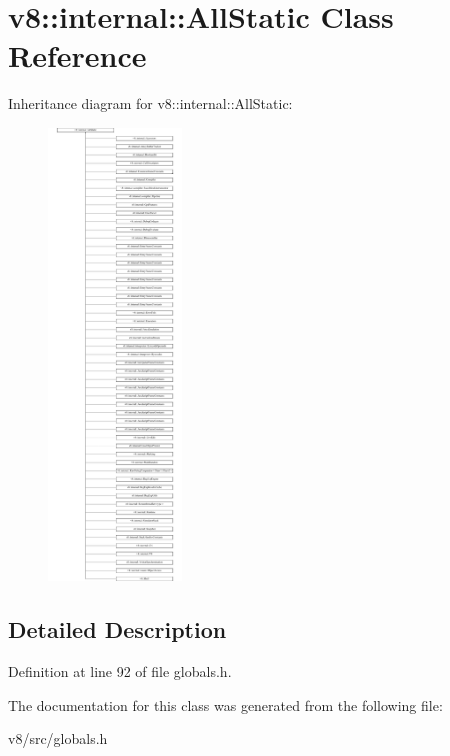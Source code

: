 \hypertarget{classv8_1_1internal_1_1AllStatic}{}\section{v8\+:\+:internal\+:\+:All\+Static Class Reference}
\label{classv8_1_1internal_1_1AllStatic}
Inheritance diagram for v8\+:\+:internal\+:\+:All\+Static\+:\begin{figure}[H]
\begin{center}
\leavevmode
\includegraphics[height=12.000000cm]{classv8_1_1internal_1_1AllStatic}
\end{center}
\end{figure}


\subsection{Detailed Description}


Definition at line 92 of file globals.\+h.



The documentation for this class was generated from the following file\+:\begin{DoxyCompactItemize}
\item 
v8/src/globals.\+h\end{DoxyCompactItemize}
